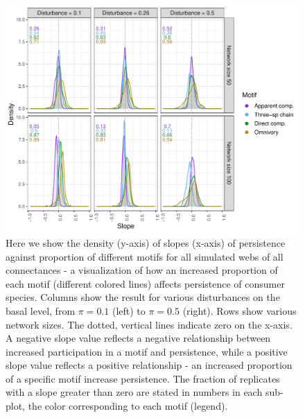 \documentclass[12pt]{article}
\begin{document}
\begin{spacing}{2.0}
    
    \begin{figure}[h!]
        \centering
            \includegraphics[width=\textwidth]{figures/prop_dens_bp_vs_S_allC.pdf}
            \caption{Here we show the density (y-axis) of slopes (x-axis) of persistence against proportion of different motifs for all simulated webs of all connectances - a visualization of how an increased proportion of each motif (different colored lines) affects persistence of consumer species. Columns show the result for various disturbances on the basal level, from $\pi = 0.1$ (left) to $\pi = 0.5$ (right). Rows show various network sizes. The dotted, vertical lines indicate zero on the x-axis. A negative slope value reflects a negative relationship between increased participation in a motif and persistence, while a positive slope value reflects a positive relationship - an increased proportion of a specific motif increase persistence. The fraction of replicates with a slope greater than zero are stated in numbers in each sub-plot, the color corresponding to each motif (legend). }
            \label{fig:density_prop_S}
        \end{figure}    

    
    

\end{spacing}
\end{document}
